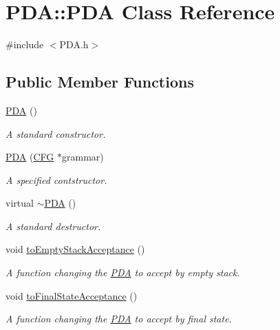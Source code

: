 \hypertarget{classPDA_1_1PDA}{\section{\-P\-D\-A\-:\-:\-P\-D\-A \-Class \-Reference}
\label{d1/dc5/classPDA_1_1PDA}
}


{\ttfamily \#include $<$\-P\-D\-A.\-h$>$}

\subsection*{\-Public \-Member \-Functions}
\begin{DoxyCompactItemize}
\item 
\hyperlink{classPDA_1_1PDA_a7785c447944c57243e2b1ea76903e3f6}{\-P\-D\-A} ()
\begin{DoxyCompactList}\small\item\em \-A standard constructor. \end{DoxyCompactList}\item 
\hyperlink{classPDA_1_1PDA_a457ac4b1de0a21642e946847b85fcc2b}{\-P\-D\-A} (\hyperlink{classCFG}{\-C\-F\-G} $\ast$grammar)
\begin{DoxyCompactList}\small\item\em \-A specified contstructor. \end{DoxyCompactList}\item 
virtual \hyperlink{classPDA_1_1PDA_a9cd56fae8de9f1cc8a6b3da52d1b525f}{$\sim$\-P\-D\-A} ()
\begin{DoxyCompactList}\small\item\em \-A standard destructor. \end{DoxyCompactList}\item 
void \hyperlink{classPDA_1_1PDA_adeb9e042e871b40ad01630d4da2e7a6a}{to\-Empty\-Stack\-Acceptance} ()
\begin{DoxyCompactList}\small\item\em \-A function changing the \hyperlink{classPDA_1_1PDA}{\-P\-D\-A} to accept by empty stack. \end{DoxyCompactList}\item 
void \hyperlink{classPDA_1_1PDA_a6c6b86cde5edba8125fcf633d0a9a916}{to\-Final\-State\-Acceptance} ()
\begin{DoxyCompactList}\small\item\em \-A function changing the \hyperlink{classPDA_1_1PDA}{\-P\-D\-A} to accept by final state. \end{DoxyCompactList}\item 

\end{DoxyCompactItemize}
